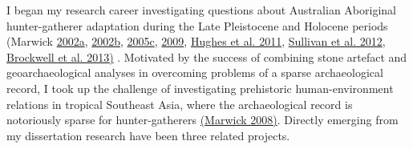 \documentclass[11pt,article,oneside]{memoir}
\begin{document}
I began my research career investigating questions about Australian Aboriginal hunter-gatherer adaptation during the Late Pleistocene and Holocene periods (Marwick {\href{http://hdl.handle.net/1885/42085}{2002a}}, {\href{http://dx.doi.org/10.6084/m9.figshare.765251}{2002b}}, {\href{http://faculty.washington.edu/bmarwick/PDFs/Marwick_2005_Marillana_A.pdf}{2005c}},  \href{http://faculty.washington.edu/bmarwick/PDFs/Marwick_2009_AO_Pilbara.pdf}{2009},  \href{http://faculty.washington.edu/bmarwick/PDFs/Hughes_et_al_2011_JASSA.pdf}{Hughes et al. 2011},  \href{http://faculty.washington.edu/bmarwick/PDFs/Sullivan_et_al_2012_OSL_dates_ODX.pdf}{Sullivan et al. 2012},  \href{http://faculty.washington.edu/bmarwick/PDFs/Brockwell_et_al_2013_AA.pdf}{Brockwell et al. 2013)} . Motivated by the success of combining stone artefact and geoarchaeological analyses in overcoming problems of a sparse archaeological record, I took up the challenge of  investigating prehistoric human-environment relations in tropical Southeast Asia, where the archaeological record is notoriously sparse for hunter-gatherers {\href{http://dx.doi.org/10.6084/m9.figshare.765252}{(Marwick 2008)}}. Directly emerging from my dissertation research have been three related projects.
\end{document}
